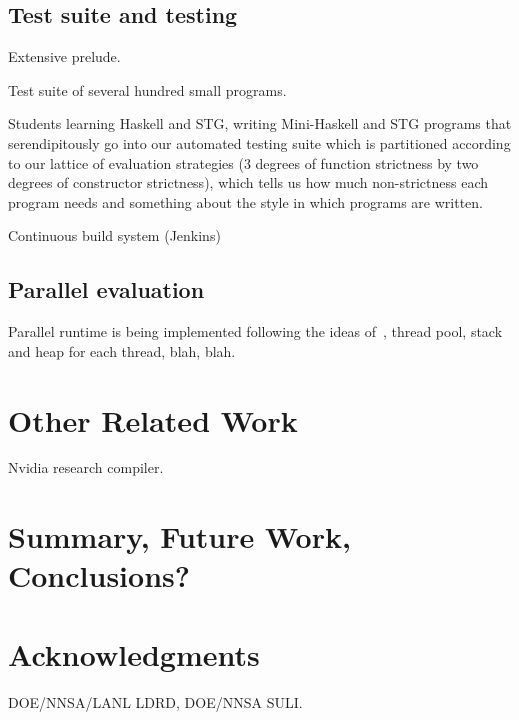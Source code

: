 \documentclass{llncs}
\begin{document}
\subsection{Test suite and testing}

Extensive prelude.

Test suite of several hundred small programs.

Students learning Haskell and STG, writing Mini-Haskell and STG programs that
serendipitously go into our automated testing suite which is partitioned
according to our lattice of evaluation strategies (3 degrees of function
strictness by two degrees of constructor strictness), which tells us how much
non-strictness each program needs and something about the style in which
programs are written.

Continuous build system (Jenkins)


\subsection{Parallel evaluation}

Parallel runtime is being implemented following the ideas of~\cite{SPJs-many-papers}, thread pool,
stack and heap for each thread, blah, blah.

\section{Other Related Work}
Nvidia research compiler.

\section{Summary, Future Work, Conclusions?}

\section{Acknowledgments}

DOE/NNSA/LANL LDRD, DOE/NNSA SULI.
\end{document}
